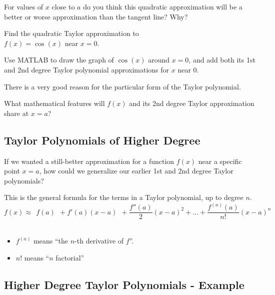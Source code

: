 For values of $x$ close to $a$ do you think this
  quadratic approximation will be a better or worse approximation than
  the tangent line?  Why?

\vfill

\newpage
{}

\problem Find the quadratic Taylor approximation to \\$f(x) = \cos(x)$
  near $x=0$.

\vfill

\newpage

\problem Use MATLAB to draw the graph of $\cos(x)$ around $x=0$, and
add both its 1st and 2nd degree Taylor polynomial approximations for
$x$ near 0.


\newpage

There is a very good reason for the particular form of the Taylor
polynomial.

\problem What mathematical features will $f(x)$ and its 2nd degree
Taylor approximation share at $x=a$?

\vfill

\newpage
{}
\subsection{Taylor Polynomials of Higher Degree}

\problem If we wanted a still-better approximation for a function
$f(x)$ near a specific point $x=a$, how could we generalize our
earlier 1st and 2nd degree Taylor polynomials?

\vfill

\newpage 

This is the general formula for the terms in a Taylor polynomial, up
to degree $n$.  \\ 

$$ f(x) \approx ~~f(a) ~~+ f'(a) (x-a) ~~+ \frac{f''(a)}{2} (x-a)^2 + \ldots 
+ \frac{f^{(n)}(a)}{n!} (x-a)^n$$   \\

\begin{itemize}
\item $f^{(n)}$ means ``the $n$-th derivative of $f$''. \\
\item $n!$ means ``$n$ factorial''
\end{itemize}

\newpage
\subsection*{Higher Degree Taylor Polynomials - Example}


